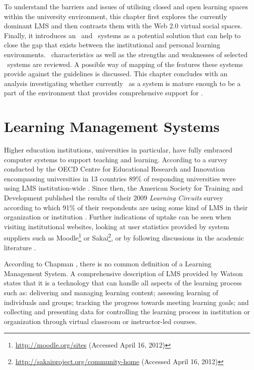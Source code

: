 To understand the barriers and issues of utilising closed and open learning
spaces within the university environment, this chapter first explores the
currently dominant LMS and then contrasts them with the Web 2.0 virtual social
spaces. Finally, it introduces an \ep~and \ep~systems as a potential solution
that can help to close the gap that exists between the institutional and
personal learning environments. \ep~characteristics as well as the strengths and
weaknesses of selected \ep~systems are reviewed. A possible way of mapping of
the features these systems provide against the \LLLs guidelines is discussed.
This chapter concludes with an analysis investigating whether currently \ep~as a
system is mature enough to be a part of the environment that provides
comprehensive support for \LLLsn.

\section{Learning Management Systems}
Higher education institutions, universities in particular, have fully embraced
computer systems to support teaching and learning. According to a survey
conducted by the OECD Centre for Educational Research and Innovation
encompassing universities in 13 countries 89\% of responding universities were
using LMS institution-wide \citep{OECD2005}. Since then, the American Society
for Training and Development published the results of their 2009
\textit{Learning Circuits} survey according to which 91\% of their respondents
are using some kind of LMS in their organization or institution
\citep{Ellis2009}. Further indications of uptake can be seen when visiting
institutional websites, looking at user statistics provided by system suppliers
such as Moodle\footnote{\url{http://moodle.org/sites} (Accessed April 16, 2012)}
or Sakai\footnote{\url{http://sakaiproject.org/community-home} (Accessed April
16, 2012)}, or by following discussions in the academic literature \citep{Browne2006,Collis2004}.

According to Chapman \citeyearpar{Chapman2009}, there is no common definition of
a Learning Management System. A comprehensive description of LMS provided by
Watson \citeyearpar{Watson2007} states that it is a technology that can handle
all aspects of the learning process such as: delivering and managing learning
content; assessing learning of individuals and groups; tracking the progress
towards meeting learning goals; and collecting and presenting data for
controlling the learning process in institution or organization through virtual
classroom or instructor-led courses.

